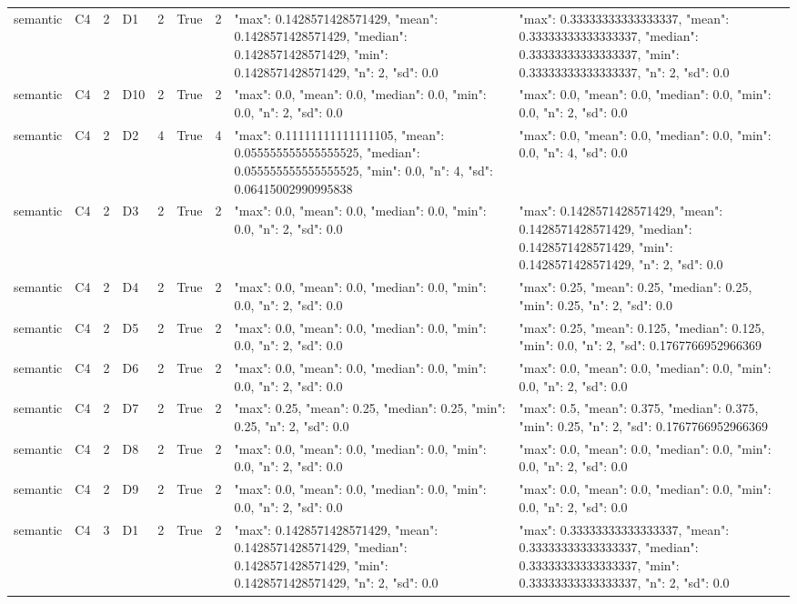 \begin{tabular}{lllllllll}
semantic & C4 & 2 & D1 & 2 & True & 2 & {"max": 0.1428571428571429, "mean": 0.1428571428571429, "median": 0.1428571428571429, "min": 0.1428571428571429, "n": 2, "sd": 0.0} & {"max": 0.33333333333333337, "mean": 0.33333333333333337, "median": 0.33333333333333337, "min": 0.33333333333333337, "n": 2, "sd": 0.0} \\
semantic & C4 & 2 & D10 & 2 & True & 2 & {"max": 0.0, "mean": 0.0, "median": 0.0, "min": 0.0, "n": 2, "sd": 0.0} & {"max": 0.0, "mean": 0.0, "median": 0.0, "min": 0.0, "n": 2, "sd": 0.0} \\
semantic & C4 & 2 & D2 & 4 & True & 4 & {"max": 0.11111111111111105, "mean": 0.055555555555555525, "median": 0.055555555555555525, "min": 0.0, "n": 4, "sd": 0.06415002990995838} & {"max": 0.0, "mean": 0.0, "median": 0.0, "min": 0.0, "n": 4, "sd": 0.0} \\
semantic & C4 & 2 & D3 & 2 & True & 2 & {"max": 0.0, "mean": 0.0, "median": 0.0, "min": 0.0, "n": 2, "sd": 0.0} & {"max": 0.1428571428571429, "mean": 0.1428571428571429, "median": 0.1428571428571429, "min": 0.1428571428571429, "n": 2, "sd": 0.0} \\
semantic & C4 & 2 & D4 & 2 & True & 2 & {"max": 0.0, "mean": 0.0, "median": 0.0, "min": 0.0, "n": 2, "sd": 0.0} & {"max": 0.25, "mean": 0.25, "median": 0.25, "min": 0.25, "n": 2, "sd": 0.0} \\
semantic & C4 & 2 & D5 & 2 & True & 2 & {"max": 0.0, "mean": 0.0, "median": 0.0, "min": 0.0, "n": 2, "sd": 0.0} & {"max": 0.25, "mean": 0.125, "median": 0.125, "min": 0.0, "n": 2, "sd": 0.1767766952966369} \\
semantic & C4 & 2 & D6 & 2 & True & 2 & {"max": 0.0, "mean": 0.0, "median": 0.0, "min": 0.0, "n": 2, "sd": 0.0} & {"max": 0.0, "mean": 0.0, "median": 0.0, "min": 0.0, "n": 2, "sd": 0.0} \\
semantic & C4 & 2 & D7 & 2 & True & 2 & {"max": 0.25, "mean": 0.25, "median": 0.25, "min": 0.25, "n": 2, "sd": 0.0} & {"max": 0.5, "mean": 0.375, "median": 0.375, "min": 0.25, "n": 2, "sd": 0.1767766952966369} \\
semantic & C4 & 2 & D8 & 2 & True & 2 & {"max": 0.0, "mean": 0.0, "median": 0.0, "min": 0.0, "n": 2, "sd": 0.0} & {"max": 0.0, "mean": 0.0, "median": 0.0, "min": 0.0, "n": 2, "sd": 0.0} \\
semantic & C4 & 2 & D9 & 2 & True & 2 & {"max": 0.0, "mean": 0.0, "median": 0.0, "min": 0.0, "n": 2, "sd": 0.0} & {"max": 0.0, "mean": 0.0, "median": 0.0, "min": 0.0, "n": 2, "sd": 0.0} \\
semantic & C4 & 3 & D1 & 2 & True & 2 & {"max": 0.1428571428571429, "mean": 0.1428571428571429, "median": 0.1428571428571429, "min": 0.1428571428571429, "n": 2, "sd": 0.0} & {"max": 0.33333333333333337, "mean": 0.33333333333333337, "median": 0.33333333333333337, "min": 0.33333333333333337, "n": 2, "sd": 0.0} \\

\end{tabular}
